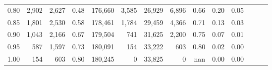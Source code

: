\begin{tabular}{rrrrrrrrrrrrrr}
0.80 &   2,902 &  2,627 &  0.48 &  176,660 &    3,585 &  26,929 &   6,896 &  0.66 &  0.20 &      0.05 \\
0.85 &   1,801 &  2,530 &  0.58 &  178,461 &    1,784 &  29,459 &   4,366 &  0.71 &  0.13 &      0.03 \\
0.90 &   1,043 &  2,166 &  0.67 &  179,504 &      741 &  31,625 &   2,200 &  0.75 &  0.07 &      0.01 \\
0.95 &     587 &  1,597 &  0.73 &  180,091 &      154 &  33,222 &     603 &  0.80 &  0.02 &      0.00 \\
1.00 &     154 &    603 &  0.80 &  180,245 &        0 &  33,825 &       0 &   nan &  0.00 &      0.00 \\
\bottomrule
\end{tabular}
